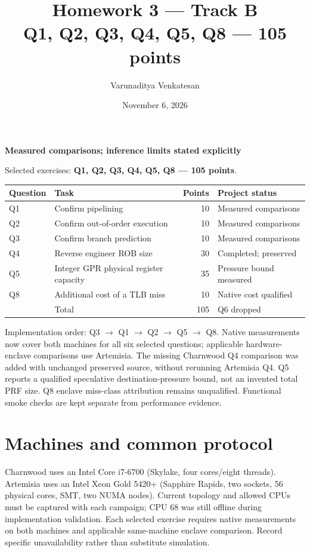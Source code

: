 \documentclass[11pt]{article}
\title{Homework 3 --- Track B\\Q1, Q2, Q3, Q4, Q5, Q8 --- 105 points}
\author{Varunaditya Venkatesan}
\date{November 6, 2026}
\begin{document}
\maketitle
\begin{center}\textbf{Measured comparisons; inference limits stated explicitly}\end{center}
\noindent Selected exercises: \textbf{Q1, Q2, Q3, Q4, Q5, Q8 --- 105 points}.
\begin{center}
\begin{tabular}{llrl}
Question & Task & Points & Project status\\\hline
Q1 & Confirm pipelining & 10 & Measured comparisons\\
Q2 & Confirm out-of-order execution & 10 & Measured comparisons\\
Q3 & Confirm branch prediction & 10 & Measured comparisons\\
Q4 & Reverse engineer ROB size & 30 & Completed; preserved\\
Q5 & Integer GPR physical register capacity & 35 & Pressure bound measured\\
Q8 & Additional cost of a TLB miss & 10 & Native cost qualified\\\hline
 & Total & 105 & Q6 dropped
\end{tabular}
\end{center}
\noindent Implementation order: Q3 $\rightarrow$ Q1 $\rightarrow$ Q2 $\rightarrow$ Q5 $\rightarrow$ Q8.
Native measurements now cover both machines for all six selected questions; applicable hardware-enclave comparisons use Artemisia. The missing Charnwood Q4 comparison was added with unchanged preserved source, without rerunning Artemisia Q4. Q5 reports a qualified speculative destination-pressure bound, not an invented total PRF size. Q8 enclave miss-class attribution remains unqualified. Functional smoke checks are kept separate from performance evidence.
\clearpage
\section{Machines and common protocol}
Charnwood uses an Intel Core i7-6700 (Skylake, four cores/eight threads). Artemisia uses an Intel Xeon Gold 5420+ (Sapphire Rapids, two sockets, 56 physical cores, SMT, two NUMA nodes). Current topology and allowed CPUs must be captured with each campaign; CPU 68 was still offline during implementation validation. Each selected exercise requires native measurements on both machines and applicable same-machine enclave comparison. Record specific unavailability rather than substitute simulation.
\end{document}
